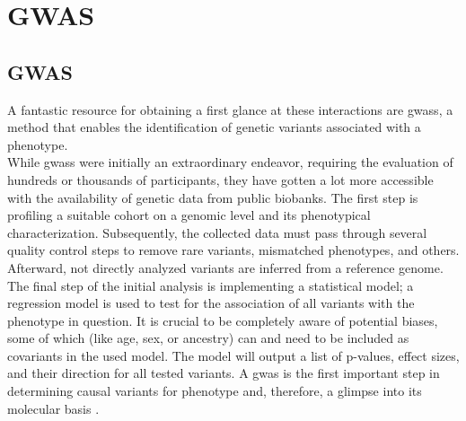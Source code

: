     \section{GWAS}
    \label{sec:gwas}

    \subsection{GWAS}
    \label{subsec:gwas_general}
    A fantastic resource for obtaining a first glance at these interactions are \acp{gwas}, a method that enables the identification of genetic variants associated with a phenotype.\\
    While \acp{gwas} were initially an extraordinary endeavor, requiring the evaluation of hundreds or thousands of participants, they have gotten a lot more accessible with the availability of genetic data from public biobanks. The first step is profiling a suitable cohort on a genomic level and its phenotypical characterization. Subsequently, the collected data must pass through several quality control steps to remove rare variants, mismatched phenotypes, and others. Afterward, not directly analyzed variants are inferred from a reference genome. The final step of the initial analysis is implementing a statistical model; a regression model is used to test for the association of all variants with the phenotype in question. It is crucial to be completely aware of potential biases, some of which (like age, sex, or ancestry) can and need to be included as covariants in the used model. \cite{uffelmannGenomewideAssociationStudies2021, flintGWAS2013} The model will output a list of p-values, effect sizes, and their direction for all tested variants. A \ac{gwas} is the first important step in determining causal variants for phenotype and, therefore, a glimpse into its molecular basis \cite{uffelmannGenomewideAssociationStudies2021}.

